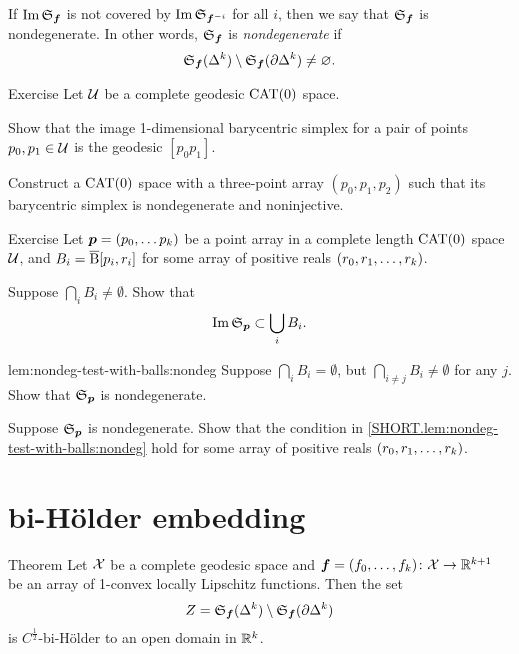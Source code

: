 If $\operatorname{\rm Im}\nolimits \mathfrak{S}_{\bm{f}}$ is not covered by $\operatorname{\rm Im}\nolimits \mathfrak{S}_{\bm{f}^{{-} i}}$ for all $i$,
then we say that $\mathfrak{S}_{\bm{f}}$ is nondegenerate.
In other words, $\mathfrak{S}_{\bm{f}}$ is \emph{nondegenerate} if 
\[\mathfrak{S}_{\bm{f}}(\Delta^k)\setminus \mathfrak{S}_{\bm{f}}(\partial \Delta^k)\ne\varnothing.\]

\begin{thm}{Exercise}\label{ex:barysimple}
Let $\mathcal{U}$ be a complete geodesic $\mathrm{CAT}(0)$ space.

Show that the image 1-dimensional barycentric simplex for a pair of points $p_0,p_1\in\mathcal{U}$ is the geodesic $[p_0p_1]$.

Construct a $\mathrm{CAT}(0)$ space with a three-point array $(p_0,p_1,p_2)$ such that its barycentric simplex is nondegenerate and noninjective. 
\end{thm}


\begin{thm}{Exercise}\label{lem:nondeg-test-with-balls}
Let $\bm{p}\z=(p_0,\dots p_\kay)$ be a point array 
in a complete length $\mathrm{CAT}(0)$ space $\mathcal{U}$, 
and $B_i=\overline{\mathrm{B}}{}[p_i,r_i]$ for some array of positive reals $(r_0,r_1,\dots,r_k)$.

\begin{subthm}{}
Suppose $\bigcap_i B_i\ne \emptyset$. Show that 
\[\operatorname{\rm Im}\nolimits\mathfrak{S}_{\bm{p}}\subset \bigcup_i B_i.\]
\end{subthm}

\begin{subthm}{lem:nondeg-test-with-balls:nondeg}
Suppose $\bigcap_i B_i= \emptyset$, but $\bigcap_{i\ne j} B_i\ne \emptyset$ for any $j$.
Show that 
$\mathfrak{S}_{\bm{p}}$ is nondegenerate.
\end{subthm}

\begin{subthm}{}
Suppose $\mathfrak{S}_{\bm{p}}$ is nondegenerate.
Show that the condition in \ref{SHORT.lem:nondeg-test-with-balls:nondeg} hold for some 
  array of positive reals $(r_0,r_1,\dots,r_k)$.
\end{subthm}

\end{thm}



\section{bi-H\"older embedding}

\begin{thm}{Theorem}\label{thm:bihoelder}
Let $\mathcal{X}$ be a complete geodesic space 
and $\bm{f}\z=(f_0,\z\dots,f_k)\:\spc{X}\to\RR^{k+1}$
be an array of 1-convex locally Lipschitz functions.
Then the set 
\[Z=\mathfrak{S}_{\bm{f}}(\Delta^k)\setminus \mathfrak{S}_{\bm{f}}(\partial \Delta^k)\]
is $C^{\frac12}$-bi-H\"older to an open domain in $\mathbb{R}^k$.
\end{thm}

